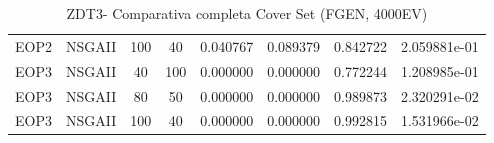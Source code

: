 \begin{table}[H]
\begin{tabular}{cccccccc}
 EOP2 &  NSGAII &  100 &   40 &            0.040767 &           0.089379 &            0.842722 &       2.059881e-01 \\
 EOP3 &  NSGAII &   40 &  100 &            0.000000 &           0.000000 &            0.772244 &       1.208985e-01 \\
 EOP3 &  NSGAII &   80 &   50 &            0.000000 &           0.000000 &            0.989873 &       2.320291e-02 \\
 EOP3 &  NSGAII &  100 &   40 &            0.000000 &           0.000000 &            0.992815 &       1.531966e-02 \\
\bottomrule
\end{tabular}
\caption{ZDT3- Comparativa completa Cover Set (FGEN, 4000EV)}
\label{table:5}
\end{table}

